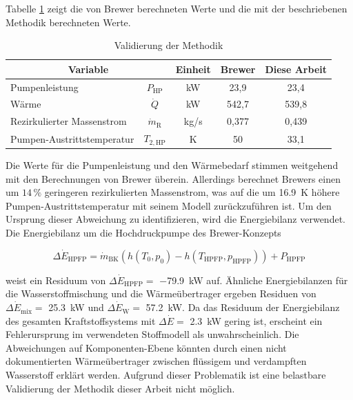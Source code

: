 Tabelle \ref{Tab:validation} zeigt die von Brewer berechneten Werte und die mit der beschriebenen Methodik berechneten Werte. 

\begin{table}[ht]
    \centering
	\caption{Validierung der Methodik}
	\begin{tabular} {|l|c|c|c|c|} \hline%
    \multicolumn{2}{|c|}{Variable} & Einheit & Brewer \cite{Brewer.1991} & Diese Arbeit \\ \hline\hline%
    Pumpenleistung & $P_\mathrm{HP}$ & kW & 23,9 & 23,4 \\ \hline
    Wärme & $\dot{Q}$ & kW & 542,7 & 539,8 \\ \hline
    Rezirkulierter Massenstrom & $\dot{m}_\mathrm{R}$ & kg/s & 0,377 & 0,439 \\ \hline
    Pumpen-Austrittstemperatur & $T_{2,\mathrm{HP}}$ & K & 50 & 33,1 \\ \hline
    \end{tabular}	
    \label{Tab:validation}%
\end{table}
\FloatBarrier 

Die Werte für die Pumpenleistung und den Wärmebedarf stimmen weitgehend mit den Berechnungen von Brewer überein. Allerdings berechnet Brewers einen um $14\,\%$ geringeren rezirkulierten Massenstrom, was auf die um \SI{16.9}{\K} höhere Pumpen-Austrittstemperatur mit seinem Modell zurückzuführen ist. Um den Ursprung dieser Abweichung zu identifizieren, wird die Energiebilanz verwendet. Die Energiebilanz um die Hochdruckpumpe des Brewer-Konzepts 

\begin{equation}\label{Eq:brewer}
	\Delta \dot{E}_\mathrm{HPFP}=\dot{m}_\mathrm{BK}(h(T_0,p_0)-h(T_\mathrm{HPFP}, p_\mathrm{HPFP}))+P_\mathrm{HPFP}
\end{equation}

weist ein Residuum von $\Delta \dot{E}_\mathrm{HPFP}=$ \SI{-79.9}{\kilo\W} auf. Ähnliche Energiebilanzen für die Wasserstoffmischung und die Wärmeübertrager ergeben Residuen von $\Delta \dot{E}_\mathrm{mix}=$ \SI{25.3}{\kilo\W} und $\Delta \dot{E}_\mathrm{W}=$ \SI{57.2}{\kilo\W}. Da das Residuum der Energiebilanz des gesamten Kraftstoffsystems mit $\Delta \dot{E}=$ \SI{2.3}{\kilo\W} gering ist, erscheint ein Fehlerursprung im verwendeten Stoffmodell als unwahrscheinlich. Die Abweichungen auf Komponenten-Ebene könnten durch einen nicht dokumentierten Wärmeübertrager zwischen flüssigem und verdampften Wasserstoff erklärt werden. Aufgrund dieser Problematik ist eine belastbare Validierung der Methodik dieser Arbeit nicht möglich.

